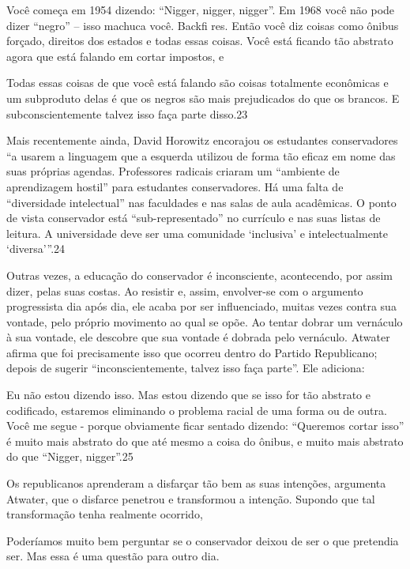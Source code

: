  \par 
Você começa em 1954 dizendo: “Nigger, nigger, nigger”. Em 1968 você não pode dizer “negro” – isso machuca você. Backfi res. Então você diz coisas como ônibus forçado, direitos dos estados e todas essas coisas. Você está ficando tão abstrato agora que está falando em cortar impostos, e
 \par 
Todas essas coisas de que você está falando são coisas totalmente econômicas e um subproduto delas é que os negros são mais prejudicados do que os brancos. E subconscientemente talvez isso faça parte disso.{\color{blue}23}
 \par 
Mais recentemente ainda, David Horowitz encorajou os estudantes conservadores “a usarem a linguagem que a esquerda utilizou de forma tão eficaz em nome das suas próprias agendas. Professores radicais criaram um “ambiente de aprendizagem hostil” para estudantes conservadores. Há uma falta de “diversidade intelectual” nas faculdades e nas salas de aula acadêmicas. O ponto de vista conservador está “sub-representado” no currículo e nas suas listas de leitura. A universidade deve ser uma comunidade ‘inclusiva’ e intelectualmente ‘diversa’”.{\color{blue}24}
 \par 
Outras vezes, a educação do conservador é inconsciente, acontecendo, por assim dizer, pelas suas costas. Ao resistir e, assim, envolver-se com o argumento progressista dia após dia, ele acaba por ser influenciado, muitas vezes contra sua vontade, pelo próprio movimento ao qual se opõe. Ao tentar dobrar um vernáculo à sua vontade, ele descobre que sua vontade é dobrada pelo vernáculo. Atwater afirma que foi precisamente isso que ocorreu dentro do Partido Republicano; depois de sugerir “inconscientemente, talvez isso faça parte”. Ele adiciona:
 \par 
Eu não estou dizendo isso. Mas estou dizendo que se isso for tão abstrato e codificado, estaremos eliminando o problema racial de uma forma ou de outra. Você me segue - porque obviamente ficar sentado dizendo: “Queremos cortar isso” é muito mais abstrato do que até mesmo a coisa do ônibus, e muito mais abstrato do que “Nigger, nigger”.{\color{blue}25}
 \par 
Os republicanos aprenderam a disfarçar tão bem as suas intenções, argumenta Atwater, que o disfarce penetrou e transformou a intenção. Supondo que tal transformação tenha realmente ocorrido,
 \par 
Poderíamos muito bem perguntar se o conservador deixou de ser o que pretendia ser. Mas essa é uma questão para outro dia.
